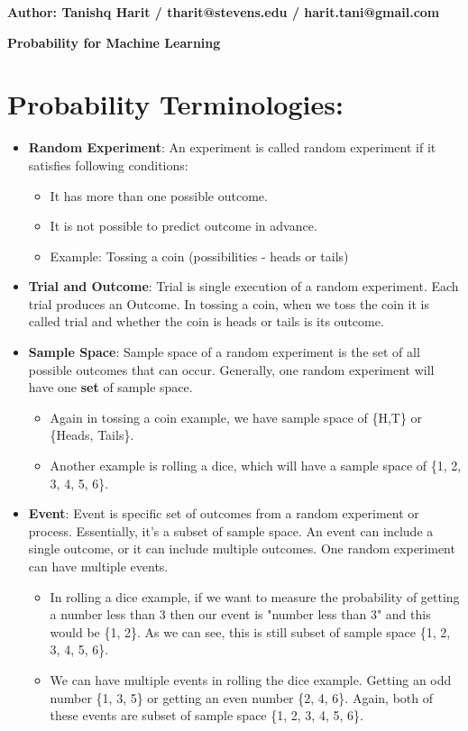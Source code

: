 \documentclass{article}
\begin{document}
\begin{flushleft}
\textbf{Author: Tanishq Harit / tharit@stevens.edu / harit.tani@gmail.com}
\end{flushleft}
\begin{center}
\textbf{\Large Probability for Machine Learning} \\
\end{center}

\section*{Probability Terminologies:}
\begin{itemize}
    \item \textbf{Random Experiment}: An experiment is called random experiment if it satisfies following conditions:
    \begin{itemize}
        \item It has more than one possible outcome.
        \item It is not possible to predict outcome in advance.
        \item Example: Tossing a coin (possibilities - heads or tails)
    \end{itemize}
    \item \textbf{Trial and Outcome}: Trial is single execution of a random experiment. Each trial produces an Outcome. In tossing a coin, when we toss the coin it is called trial and whether the coin is heads or tails is its outcome.
    \item \textbf{Sample Space}: Sample space of a random experiment is the set of all possible outcomes that can occur. Generally, one random experiment will have one \textbf{set} of sample space.
    \begin{itemize}
        \item Again in tossing a coin example, we have sample space of \{H,T\} or \{Heads, Tails\}.
        \item Another example is rolling a dice, which will have a sample space of \{1, 2, 3, 4, 5, 6\}.
    \end{itemize}
    \item \textbf{Event}: Event is specific set of outcomes from a random experiment or process. Essentially, it's a subset of sample space. An event can include a single outcome, or it can include multiple outcomes. One random experiment can have multiple events.
    \begin{itemize}
        \item In rolling a dice example, if we want to measure the probability of getting a number less than 3 then our event is "number less than 3" and this would be \{1, 2\}. As we can see, this is still subset of sample space \{1, 2, 3, 4, 5, 6\}.
        \item We can have multiple events in rolling the dice example. Getting an odd number \{1, 3, 5\} or getting an even number \{2, 4, 6\}. Again, both of these events are subset of sample space \{1, 2, 3, 4, 5, 6\}.
    \end{itemize}
\end{itemize}
\end{document}
